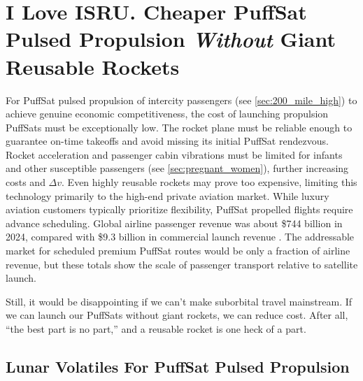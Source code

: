 \documentclass{article}
\newcommand{\deltav}{\Delta v}
\begin{document}
\section{I Love ISRU.  Cheaper PuffSat Pulsed Propulsion \textit{Without} Giant Reusable Rockets}\label{sec:isru}
For PuffSat pulsed propulsion of intercity passengers (see \autoref{sec:200_mile_high}) to achieve genuine economic competitiveness, the cost of launching propulsion PuffSats must be exceptionally low.  The rocket plane must be reliable enough to guarantee on-time takeoffs and avoid missing its initial PuffSat rendezvous.  Rocket acceleration and passenger cabin vibrations must be limited for infants and other susceptible passengers (see \autoref{sec:pregnant_women}), further increasing costs and $\deltav$.  Even highly reusable rockets may prove too expensive, limiting this technology primarily to the high-end private aviation market. While luxury aviation customers typically prioritize flexibility, PuffSat propelled flights require advance scheduling. Global airline passenger revenue was about \$744 billion in 2024, compared with \$9.3 billion in commercial launch revenue \cite{sia_satellite_industry_2025,iata_air_transport_2024}. The addressable market for scheduled premium PuffSat routes would be only a fraction of airline revenue, but these totals show the scale of passenger transport relative to satellite launch.

Still, it would be disappointing if we can't make suborbital travel mainstream.   If we can launch our PuffSats without giant rockets, we can reduce cost.   After all, ``the best part is no part,'' \cite{best_part_no_part} and a reusable rocket is one heck of a part.

\subsection{Lunar Volatiles For PuffSat Pulsed Propulsion}
\end{document}
